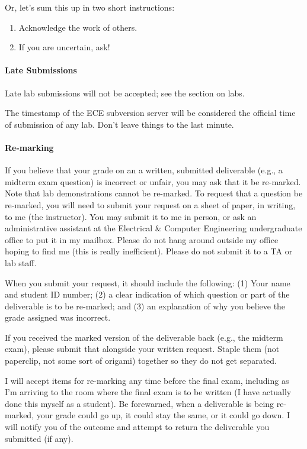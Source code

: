 \documentclass[letterpaper,10pt]{article}
\begin{document}
Or, let's sum this up in two short instructions:
\begin{enumerate}
	\item Acknowledge the work of others. 
	\item If you are uncertain, ask!
\end{enumerate}

\paragraph{Late Submissions} Late lab submissions will not be accepted; see the section on labs.

The timestamp of the ECE subversion server will be considered the official time of submission of any lab. Don't leave things to the last minute.

\paragraph{Re-marking}
If you believe that your grade on an a written, submitted deliverable (e.g., a midterm exam question) is incorrect or unfair, you may ask that it be re-marked. Note that lab demonstrations cannot be re-marked. To request that a question be re-marked, you will need to submit your request on a sheet of paper, in writing, to me (the instructor). You may submit it to me in person, or ask an administrative assistant at the Electrical \& Computer Engineering undergraduate office to put it in my mailbox. Please do not hang around outside my office hoping to find me (this is really inefficient). Please do not submit it to a TA or lab staff. 

When you submit your request, it should include the following: (1) Your name and student ID number; (2) a clear indication of which question or part of the deliverable is to be re-marked; and (3) an explanation of why you believe the grade assigned was incorrect.

If you received the marked version of the deliverable back (e.g., the midterm exam), please submit that alongside your written request. Staple them (not paperclip, not some sort of origami) together so they do not get separated.

I will accept items for re-marking any time before the final exam, including as I'm arriving to the room where the final exam is to be written (I have actually done this myself as a student). Be forewarned, when a deliverable is being re-marked, your grade could go up, it could stay the same, or it could go down. I will notify you of the outcome and attempt to return the deliverable you submitted (if any).
\end{document}
